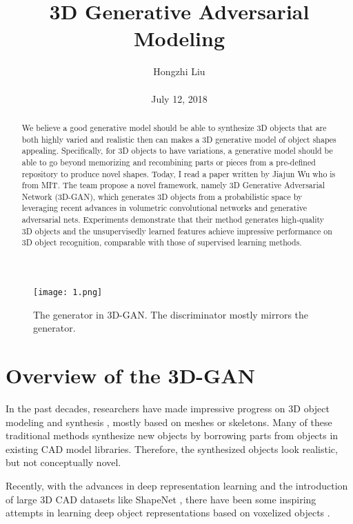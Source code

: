 \documentclass[10pt,twocolumn,letterpaper]{article}
\title{3D Generative Adversarial Modeling}
\author{Hongzhi Liu\\\\
July 12, 2018}
\begin{document}
\maketitle
\begin{abstract}
	We believe a good generative model should be able to synthesize 3D objects that are both highly varied and realistic then can makes a 3D generative model of object shapes appealing. Specifically, for 3D objects to have variations, a generative model should be able to go beyond memorizing and recombining parts or pieces from a pre-defined repository to produce novel shapes. Today, I read a paper written by Jiajun Wu who is from MIT. The team propose a novel framework, namely 3D Generative Adversarial Network (3D-GAN), which generates 3D objects from a probabilistic space by leveraging recent advances in volumetric convolutional networks and generative adversarial nets. Experiments demonstrate that their method generates high-quality 3D objects and the unsupervisedly learned features achieve impressive performance on 3D object recognition, comparable with those of supervised learning methods.
\end{abstract}

\begin{figure*}[!b]
	\begin{center}
		\texttt{[image: 1.png]}
	\end{center}
	\caption{The generator in 3D-GAN. The discriminator mostly mirrors the generator.}
	\label{p1}
\end{figure*}

\section{Overview of the 3D-GAN}

In the past decades, researchers have made impressive progress on 3D object modeling and synthesis \cite{Tangelder2008A}, mostly based on meshes or skeletons. Many of these traditional methods synthesize new objects by borrowing parts from objects in existing CAD model libraries. Therefore, the synthesized objects look realistic, but not conceptually novel.

Recently, with the advances in deep representation learning and the introduction of large 3D CAD datasets like ShapeNet \cite{Chang2015ShapeNet}, there have been some inspiring attempts in learning deep object representations based on voxelized objects \cite{Girdhar2016Learning}.
\end{document}
